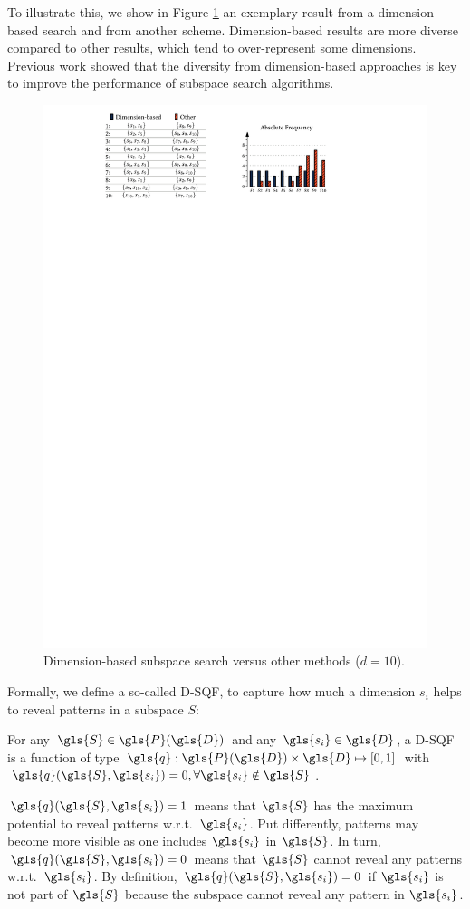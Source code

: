To illustrate this, we show in Figure \ref{fig:GMD_example} an exemplary result from a dimension-based search and from another scheme. Dimension-based results are more diverse compared to other results, which tend to over-represent some dimensions. Previous work \cite{DBLP:journals/ijdsa/TrittenbachB19} showed that the diversity from dimension-based approaches is key to improve the performance of subspace search algorithms. 
\begin{figure}
	\centering
	\includegraphics[width=0.9\linewidth]{part4-figures/example_gmd-compressed.pdf}
	\caption{Dimension-based subspace search versus other methods ($d=10$).} 
	\label{fig:GMD_example}
\end{figure} 

Formally, we define a so-called \gls{D-SQF}, to capture how much a dimension $s_i$ helps to reveal patterns in a subspace $S$:  
\begin{definition}
	\label{def:sqf}
	For any $ {\gls{S}} \in \gls{P}( \gls{D})$ and any $ \gls{s_i} \in  \gls{D}$, a \acrfull{D-SQF} is a function of type $\gls{q}:   \gls{P}( \gls{D}) \times  \gls{D}  \mapsto [0,1]$ with $\gls{q}(\gls{S}, \gls{s_i}) = 0, \forall  \gls{s_i} \notin  \gls{S}$.
\end{definition}
$\gls{q}(\gls{S}, \gls{s_i})=1$ means that $\gls{S}$ has the maximum potential to reveal patterns w.r.t.\ $\gls{s_i}$. Put differently, patterns may become more visible as one includes $\gls{s_i}$ in $\gls{S}$. 
In turn, $\gls{q}(\gls{S}, \gls{s_i})=0$ means that $\gls{S}$ cannot reveal any patterns w.r.t.\ $\gls{s_i}$. By definition, $\gls{q}(\gls{S}, \gls{s_i})=0$ if $\gls{s_i}$ is not part of $\gls{S}$ because the subspace cannot reveal any pattern in $\gls{s_i}$. 

